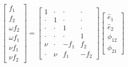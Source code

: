 \begin{equation}\label{eq:sys-Henry2015}
\left[\begin{array}{c}
	   f_1     \\
	   f_2     \\
	\omega f_2 \\
  \omega f_1 \\
	  \nu f_1  \\
    \nu f_2
\end{array}\right]
=
\left[\begin{array}{cccc}
	  1   & \cdot & \cdot & \cdot \\
	\cdot &   1   & \cdot & \cdot \\
	\cdot & \cdot &   1   & \cdot \\
	\cdot & \cdot & \cdot &   1   \\
	 \nu  & \cdot & -f_1  &  f_2  \\
	\cdot &  \nu  &  f_1  & -f_2
\end{array}\right]
\left[\begin{array}{c}
	\hat{e}_1 \\
	\hat{e}_2 \\
	\phi_{12} \\
	\phi_{21}
\end{array}\right]
\end{equation}